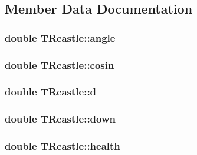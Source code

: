 \subsection{Member Data Documentation}
\subsubsection[{\texorpdfstring{angle}{angle}}]{\setlength{\rightskip}{0pt plus 5cm}double T\+Rcastle\+::angle}\hypertarget{struct_t_rcastle_a2fd7be705bdd092f15e434666d793329}{}\label{struct_t_rcastle_a2fd7be705bdd092f15e434666d793329}
\subsubsection[{\texorpdfstring{cosin}{cosin}}]{\setlength{\rightskip}{0pt plus 5cm}double T\+Rcastle\+::cosin}\hypertarget{struct_t_rcastle_ad7002df0e24f1d7d6c36240ea4aac2a2}{}\label{struct_t_rcastle_ad7002df0e24f1d7d6c36240ea4aac2a2}
\subsubsection[{\texorpdfstring{d}{d}}]{\setlength{\rightskip}{0pt plus 5cm}double T\+Rcastle\+::d}\hypertarget{struct_t_rcastle_adaf3bf8d36b2d4115959858737f4d277}{}\label{struct_t_rcastle_adaf3bf8d36b2d4115959858737f4d277}
\subsubsection[{\texorpdfstring{down}{down}}]{\setlength{\rightskip}{0pt plus 5cm}double T\+Rcastle\+::down}\hypertarget{struct_t_rcastle_a6256c708f2b3e4114c0ebab3f388aede}{}\label{struct_t_rcastle_a6256c708f2b3e4114c0ebab3f388aede}
\subsubsection[{\texorpdfstring{health}{health}}]{\setlength{\rightskip}{0pt plus 5cm}double T\+Rcastle\+::health}\hypertarget{struct_t_rcastle_a8fc2c90a8127bac5ea539f14d6da4850}{}\label{struct_t_rcastle_a8fc2c90a8127bac5ea539f14d6da4850}
